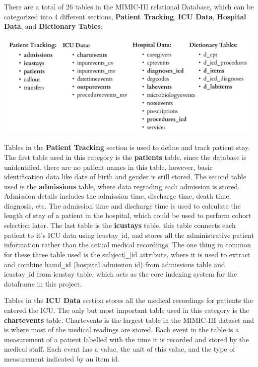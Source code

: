 \documentclass{l4proj}
\begin{document}
    There are a total of 26 tables in the MIMIC-III relational Database, which can be categorized into 4 different sections, \textbf{Patient Tracking}, \textbf{ICU Data}, \textbf{Hospital Data}, and \textbf{Dictionary Tables}:

    \includegraphics[width=\textwidth]{dissertation/Latex/images/tables.PNG}
        
    Tables in the \textbf{Patient Tracking} section is used to define and track patient stay. The first table used in this category is the \textbf{patients} table, since the database is unidentified, there are no patient names in this table, however, basic identification data like date of birth and gender is still stored. The second table used is the \textbf{admissions} table, where data regrading each admission is stored. Admission details includes the admission time, discharge time, death time, diagnosis, etc. The admission time and discharge time is used to calculate the length of stay of a patient in the hospital, which could be used to perform cohort selection later. The last table is the \textbf{icustays} table, this table connects each patient to it's ICU data using icustay\verb|_|id, and stores all the administrative patient information rather than the actual medical recordings. The one thing in common for these three table used is the subject|\verb|_||id attribute, where it is used to extract and combine hamd\verb|_|id (hospital admission id) from admissions table and icustay\verb|_|id from icustay table, which acts as the core indexing system for the dataframe in this project.

    Tables in the \textbf{ICU Data} section stores all the medical recordings for patients the entered the ICU. The only but most important table used in this category is the \textbf{chartevents} table. Chartevents is the largest table in the MIMIC-III dataset and is where most of the medical readings are stored. Each event in the table is a measurement of a patient labelled with the time it is recorded and stored by the medical staff. Each event has a value, the unit of this value, and the type of measurement indicated by an item id. 
    
\end{document}
